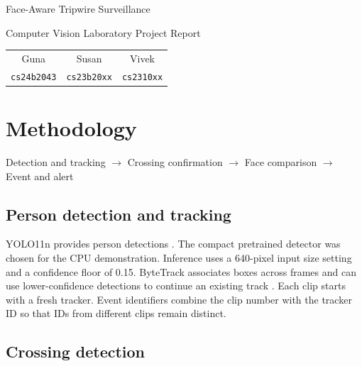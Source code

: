 \documentclass[11pt,a4paper]{article}
\begin{document}
\begin{center}
  {\LARGE Face-Aware Tripwire Surveillance\par}
  \smallskip
  {\large Computer Vision Laboratory Project Report\par}
  \medskip
  \begin{tabular}{ccc}
    Guna & Susan & Vivek \\
    \texttt{cs24b2043} & \texttt{cs23b20xx} & \texttt{cs2310xx}
  \end{tabular}
\end{center}

\begin{abstract}
This project detects when a tracked person enters or exits a rectangular region in recorded video. For each confirmed entry, it compares usable face observations with an enrolled reference. A clear non-match produces a JPEG alert. In the demonstration, the system recorded one match, one non-match, one unverified entry and one exit. The non-matching track generated one alert during its visit. The unverified entry came from a replay with the face area deliberately covered.
\end{abstract}

\section{Methodology}

\begin{center}
  \small Detection and tracking \(\rightarrow\) Crossing confirmation
  \(\rightarrow\) Face comparison \(\rightarrow\) Event and alert
\end{center}

\subsection{Person detection and tracking}

YOLO11n provides person detections \cite{yolo}. The compact pretrained detector was chosen for the CPU demonstration. Inference uses a 640-pixel input size setting and a confidence floor of 0.15. ByteTrack associates boxes across frames and can use lower-confidence detections to continue an existing track \cite{bytetrack}. Each clip starts with a fresh tracker. Event identifiers combine the clip number with the tracker ID so that IDs from different clips remain distinct.

\subsection{Crossing detection}
\end{document}
